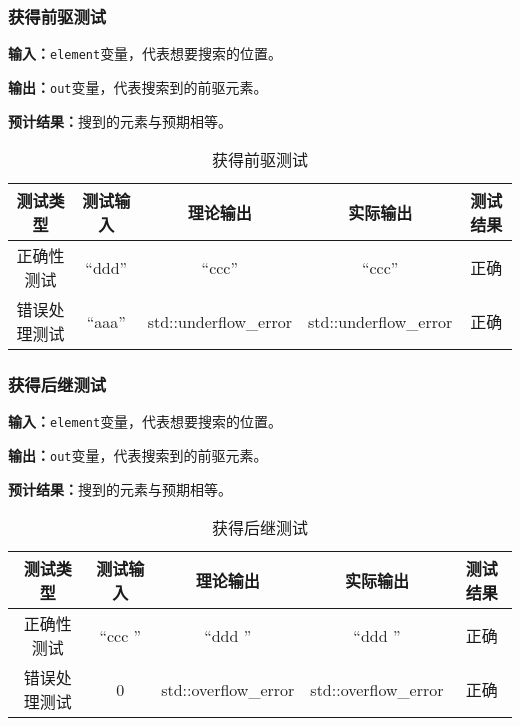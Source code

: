 \subsubsection{获得前驱测试}
\textbf{输入：}\texttt{element}变量，代表想要搜索的位置。
\par
\textbf{输出：}\texttt{out}变量，代表搜索到的前驱元素。
\par
\textbf{预计结果：}搜到的元素与预期相等。
\begin{table}[h]
    \centering
    \caption{获得前驱测试}
    \begin{tabular}{@{}ccccc@{}}
        \toprule
        \multicolumn{1}{c}{测试类型}    & \multicolumn{1}{c}{测试输入} & \multicolumn{1}{c}{理论输出} & \multicolumn{1}{c}{实际输出} &
        \multicolumn{1}{c}{测试结果} \\ \midrule
        \multicolumn{1}{c|}{正确性测试}  & ``ddd''&``ccc''&``ccc''&正确\\
        \multicolumn{1}{c|}{错误处理测试} & ``aaa''& std::underflow\_error& std::underflow\_error& 正确\\ \bottomrule
    \end{tabular}
    \label{tab:priortest1}
\end{table}

\subsubsection{获得后继测试}
\textbf{输入：}\texttt{element}变量，代表想要搜索的位置。
\par
\textbf{输出：}\texttt{out}变量，代表搜索到的前驱元素。
\par
\textbf{预计结果：}搜到的元素与预期相等。
\begin{table}[h]
    \centering
    \caption{获得后继测试}
    \begin{tabular}{@{}ccccc@{}}
        \toprule
        \multicolumn{1}{c}{测试类型}    & \multicolumn{1}{c}{测试输入} & \multicolumn{1}{c}{理论输出} & \multicolumn{1}{c}{实际输出} &
        \multicolumn{1}{c}{测试结果} \\ \midrule
        \multicolumn{1}{c|}{正确性测试}  & ``ccc ''&``ddd ''&``ddd ''&正确\\
        \multicolumn{1}{c|}{错误处理测试} & 0& std::overflow\_error& std::overflow\_error& 正确\\ \bottomrule
    \end{tabular}
    \label{tab:nexttest1}
\end{table}

